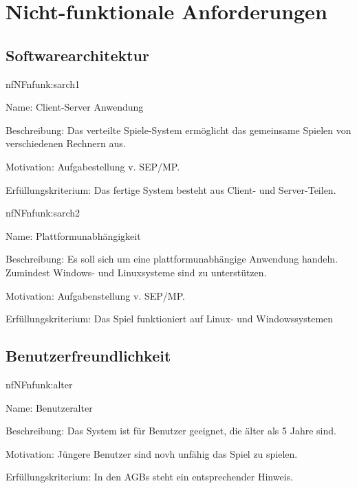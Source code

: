 \chapter{Nicht-funktionale Anforderungen}

\setcounter{nf}{10}

\section{Softwarearchitektur}

\begin{description}[leftmargin=5em, style=sameline]	
	\begin{lhp}{nf}{NF}{nfunk:sarch1}
		\item [Name:] Client-Server Anwendung
		\item [Beschreibung:] Das verteilte Spiele-System ermöglicht das gemeinsame Spielen von verschiedenen Rechnern aus.
		\item [Motivation:] Aufgabestellung v. SEP/MP.
		\item [Erfüllungskriterium:] Das fertige System besteht aus Client- und Server-Teilen.
	\end{lhp}
	
	\begin{lhp}{nf}{NF}{nfunk:sarch2}
		\item [Name:] Plattformunabhängigkeit
		\item [Beschreibung:] Es soll sich um eine plattformunabhängige Anwendung handeln. Zumindest Windows- und Linuxsysteme sind zu unterstützen.
		\item [Motivation:] Aufgabenstellung v. SEP/MP.
		\item [Erfüllungskriterium:] Das Spiel funktioniert auf Linux- und Windowssystemen
	\end{lhp}
\end{description}



\section{Benutzerfreundlichkeit}


\begin{description}[leftmargin=5em, style=sameline]	
	\begin{lhp}{nf}{NF}{nfunk:alter}
		\item [Name:] Benutzeralter
		\item [Beschreibung:] Das System ist für Benutzer geeignet, die älter als 5 Jahre sind.
		\item [Motivation:] Jüngere Benutzer sind novh unfähig das Spiel zu spielen.
		\item [Erfüllungskriterium:] In den AGBs steht ein entsprechender Hinweis.
	\end{lhp}
\end{description}

